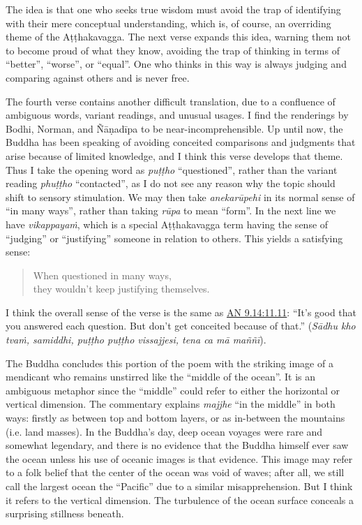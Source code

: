 \documentclass[12pt,openany]{book}%
\begin{document}
The idea is that one who seeks true wisdom must avoid the trap of identifying with their mere conceptual understanding, which is, of course, an overriding theme of the \textsanskrit{Aṭṭhakavagga}. The next verse expands this idea, warning them not to become proud of what they know, avoiding the trap of thinking in terms of “better”, “worse”, or “equal”. One who thinks in this way is always judging and comparing against others and is never free.

The fourth verse contains another difficult translation, due to a confluence of ambiguous words, variant readings, and unusual usages. I find the renderings by Bodhi, Norman, and \textsanskrit{Ñāṇadīpa} to be near-incomprehensible. Up until now, the Buddha has been speaking of avoiding conceited comparisons and judgments that arise because of limited knowledge, and I think this verse develops that theme. Thus I take the opening word as \textit{\textsanskrit{puṭṭho}} “questioned”, rather than the variant reading \textit{\textsanskrit{phuṭṭho}} “contacted”, as I do not see any reason why the topic should shift to sensory stimulation. We may then take \textit{\textsanskrit{anekarūpehi}} in its normal sense of “in many ways”, rather than taking \textit{\textsanskrit{rūpa}} to mean “form”. In the next line we have \textit{\textsanskrit{vikappayaṁ}}, which is a special \textsanskrit{Aṭṭhakavagga} term having the sense of “judging” or “justifying” someone in relation to others. This yields a satisfying sense:

\begin{verse}%
When questioned in many ways, \\
they wouldn’t keep justifying themselves.

%
\end{verse}

I think the overall sense of the verse is the same as \href{https://suttacentral.net/an9.14/en/sujato\#11.11}{AN 9.14:11.11}: “It’s good that you answered each question. But don’t get conceited because of that.” (\textit{\textsanskrit{Sādhu} kho \textsanskrit{tvaṁ}, samiddhi, \textsanskrit{puṭṭho} \textsanskrit{puṭṭho} vissajjesi, tena ca \textsanskrit{mā} \textsanskrit{maññī}}).

The Buddha concludes this portion of the poem with the striking image of a mendicant who remains unstirred like the “middle of the ocean”. It is an ambiguous metaphor since the “middle” could refer to either the horizontal or vertical dimension. The commentary explains \textit{majjhe} “in the middle” in both ways: firstly as between top and bottom layers, or as in-between the mountains (i.e. land masses). In the Buddha’s day, deep ocean voyages were rare and somewhat legendary, and there is no evidence that the Buddha himself ever saw the ocean unless his use of oceanic images is that evidence. This image may refer to a folk belief that the center of the ocean was void of waves; after all, we still call the largest ocean the “Pacific” due to a similar misapprehension. But I think it refers to the vertical dimension. The turbulence of the ocean surface conceals a surprising stillness beneath.
\end{document}
